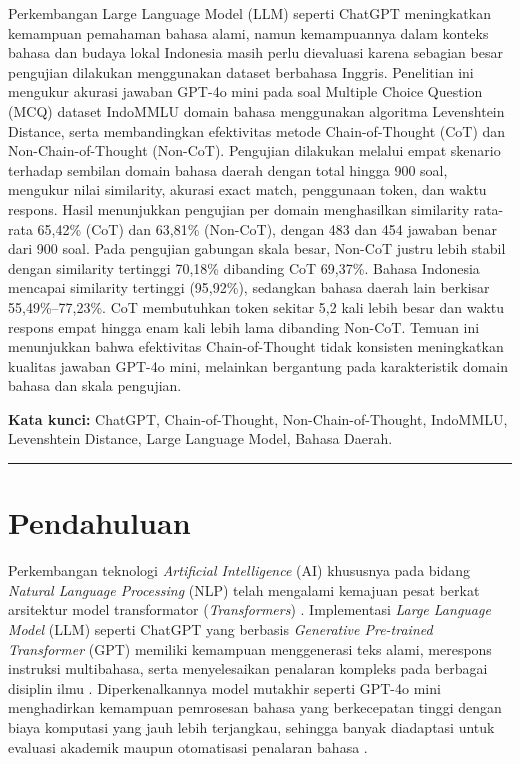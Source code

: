 \documentclass[10pt,a4paper]{article}
\begin{document}
{\fontsize{10pt}{13.5pt}\selectfont
Perkembangan Large Language Model (LLM) seperti ChatGPT meningkatkan kemampuan pemahaman bahasa alami, namun kemampuannya dalam konteks bahasa dan budaya lokal Indonesia masih perlu dievaluasi karena sebagian besar pengujian dilakukan menggunakan dataset berbahasa Inggris. Penelitian ini mengukur akurasi jawaban GPT-4o mini pada soal Multiple Choice Question (MCQ) dataset IndoMMLU domain bahasa menggunakan algoritma Levenshtein Distance, serta membandingkan efektivitas metode Chain-of-Thought (CoT) dan Non-Chain-of-Thought (Non-CoT). Pengujian dilakukan melalui empat skenario terhadap sembilan domain bahasa daerah dengan total hingga 900 soal, mengukur nilai similarity, akurasi exact match, penggunaan token, dan waktu respons. Hasil menunjukkan pengujian per domain menghasilkan similarity rata-rata 65,42\% (CoT) dan 63,81\% (Non-CoT), dengan 483 dan 454 jawaban benar dari 900 soal. Pada pengujian gabungan skala besar, Non-CoT justru lebih stabil dengan similarity tertinggi 70,18\% dibanding CoT 69,37\%. Bahasa Indonesia mencapai similarity tertinggi (95,92\%), sedangkan bahasa daerah lain berkisar 55,49\%--77,23\%. CoT membutuhkan token sekitar 5,2 kali lebih besar dan waktu respons empat hingga enam kali lebih lama dibanding Non-CoT. Temuan ini menunjukkan bahwa efektivitas Chain-of-Thought tidak konsisten meningkatkan kualitas jawaban GPT-4o mini, melainkan bergantung pada karakteristik domain bahasa dan skala pengujian.\par}

\vspace{4pt}
{\fontsize{10pt}{12pt}\selectfont\textbf{Kata kunci:} ChatGPT, Chain-of-Thought, Non-Chain-of-Thought, IndoMMLU, Levenshtein Distance, Large Language Model, Bahasa Daerah.\par}

\vspace{2pt}
\noindent\rule{\textwidth}{0.4pt}
\vspace{3pt}

\section{Pendahuluan}

Perkembangan teknologi \textit{Artificial Intelligence} (AI) khususnya pada bidang \textit{Natural Language Processing} (NLP) telah mengalami kemajuan pesat berkat arsitektur model transformator (\textit{Transformers}) \cite{wolf2020transformers}. Implementasi \textit{Large Language Model} (LLM) seperti ChatGPT yang berbasis \textit{Generative Pre-trained Transformer} (GPT) memiliki kemampuan menggenerasi teks alami, merespons instruksi multibahasa, serta menyelesaikan penalaran kompleks pada berbagai disiplin ilmu \cite{maitland2024chatgpt, strachan2024testing}. Diperkenalkannya model mutakhir seperti GPT-4o mini menghadirkan kemampuan pemrosesan bahasa yang berkecepatan tinggi dengan biaya komputasi yang jauh lebih terjangkau, sehingga banyak diadaptasi untuk evaluasi akademik maupun otomatisasi penalaran bahasa \cite{ting2024performance}.
\end{document}
